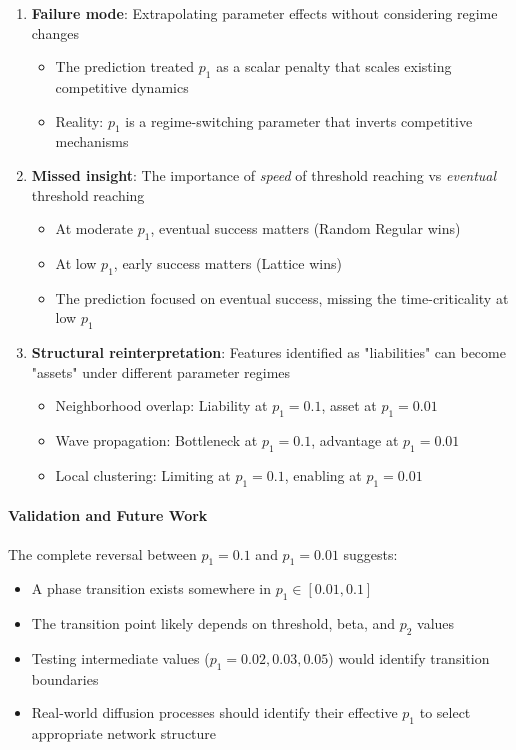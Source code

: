 \documentclass[12pt,a4paper]{article}
\begin{document}
\begin{enumerate}
    \item \textbf{Failure mode}: Extrapolating parameter effects without considering regime changes
    \begin{itemize}
        \item The prediction treated $p_1$ as a scalar penalty that scales existing competitive dynamics
        \item Reality: $p_1$ is a regime-switching parameter that inverts competitive mechanisms
    \end{itemize}

    \item \textbf{Missed insight}: The importance of \textit{speed} of threshold reaching vs \textit{eventual} threshold reaching
    \begin{itemize}
        \item At moderate $p_1$, eventual success matters (Random Regular wins)
        \item At low $p_1$, early success matters (Lattice wins)
        \item The prediction focused on eventual success, missing the time-criticality at low $p_1$
    \end{itemize}

    \item \textbf{Structural reinterpretation}: Features identified as "liabilities" can become "assets" under different parameter regimes
    \begin{itemize}
        \item Neighborhood overlap: Liability at $p_1=0.1$, asset at $p_1=0.01$
        \item Wave propagation: Bottleneck at $p_1=0.1$, advantage at $p_1=0.01$
        \item Local clustering: Limiting at $p_1=0.1$, enabling at $p_1=0.01$
    \end{itemize}
\end{enumerate}

\paragraph{Validation and Future Work}

The complete reversal between $p_1=0.1$ and $p_1=0.01$ suggests:

\begin{itemize}
    \item A phase transition exists somewhere in $p_1 \in [0.01, 0.1]$
    \item The transition point likely depends on threshold, beta, and $p_2$ values
    \item Testing intermediate values ($p_1 = 0.02, 0.03, 0.05$) would identify transition boundaries
    \item Real-world diffusion processes should identify their effective $p_1$ to select appropriate network structure
\end{itemize}
\end{document}

